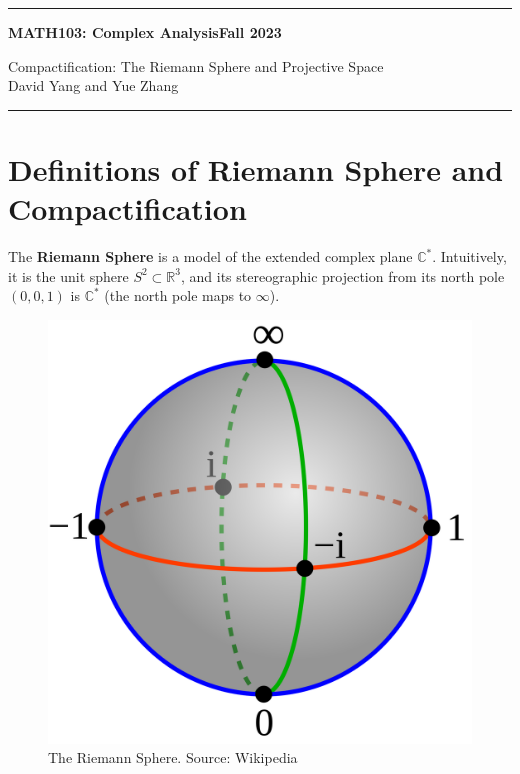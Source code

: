 \documentclass[11pt]{article}
\begin{document}
	\hrule
	\begin{center}
        \textbf{MATH103: Complex Analysis}\hfill \textbf{Fall 2023}\newline

		{\Large Compactification: The Riemann Sphere and Projective Space} \\
        David Yang and Yue Zhang
	\end{center}

\hrule

\vspace{1em}

\section{Definitions of Riemann Sphere and Compactification}

\begin{definition} The \textbf{Riemann Sphere} is a model of the extended complex plane $\mathbb{C}^*$. Intuitively, it is the unit sphere $S^2\subset \mathbb{R}^3$, and its stereographic projection from its north pole $(0,0,1)$ is $\mathbb{C}^*$ (the north pole maps to $\infty$).
\end{definition}
\begin{figure}[ht]
    \centering
    \includegraphics[scale=0.05]{RiemannSphere.png}
    \caption{The Riemann Sphere. Source: Wikipedia}
\end{figure}
\end{document}
